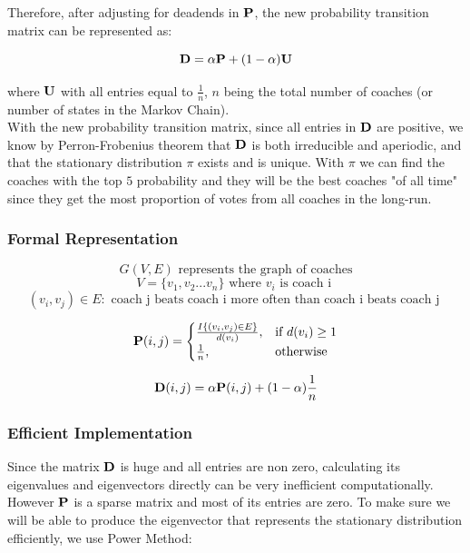 \documentclass[titlepage]{article}
\begin{document}
\noindent Therefore, after adjusting for deadends in ${\bf P}$, the new probability transition matrix can be represented as:

$${\bf D} = \alpha {\bf P} + (1 - \alpha) {\bf U}$$

\noindent where $\bf{U}$ with all entries equal to $\frac{1}{n}$, $n$ being the total number of coaches (or number of states in the Markov Chain).
\\

\noindent With the new probability transition matrix, since all entries in $\bf{D}$ are positive, we know by Perron-Frobenius theorem that $\bf{D}$ is both irreducible and aperiodic, and that the stationary distribution $\pi$ exists and is unique. With $\pi$ we can find the coaches with the top $5$ probability and they will be the best coaches "of all time" since they get the most proportion of votes from all coaches in the long-run.

\subsubsection*{Formal Representation}

$$G(V, E) \mbox{ represents the graph of coaches}$$
$$V = \{v_1, v_2 ... v_n\} \mbox{ where } v_i \mbox{ is coach i }$$
$$(v_i, v_j) \in E : \mbox{ coach j beats coach i more often than coach i beats coach j }$$



\[
    {\bf P} (i, j)= 
\begin{cases}
    \frac{ I\{(v_i, v_j) \in E\}}{d(v_i)},& \text{if } d(v_i) \geq 1\\
    \frac{1}{n},              & \text{otherwise}
\end{cases}
\]

$${\bf D} (i, j) = \alpha {\bf P} (i, j)  + (1-\alpha)\frac{1}{n}$$


\subsubsection*{Efficient Implementation}


Since the matrix ${\bf D}$ is huge and all entries are non zero, calculating its eigenvalues and eigenvectors directly can be very inefficient computationally. However ${\bf P}$ is a sparse matrix and most of its entries are zero. To make sure we will be able to produce the eigenvector that represents the stationary distribution efficiently, we use Power Method:

\vspace{5mm}
\end{document}
